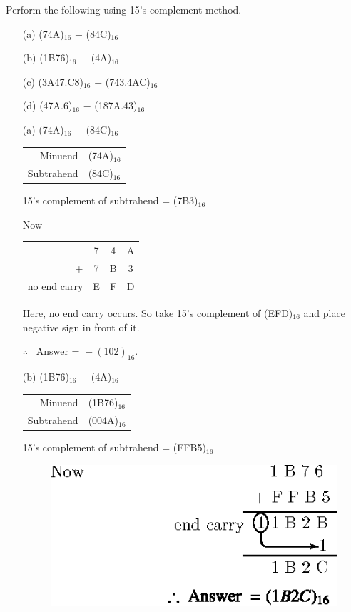 \eject

\begin{problem}\label{prob5.41}
Perform the following using 15's complement method.
\begin{itemize}
\item[(a)] (74A)$_{16}$ $-$ (84C)$_{16}$

\item[(b)] (1B76)$_{16}$ $-$ (4A)$_{16}$

\item[(c)] (3A47.C8)$_{16}$ $-$ (743.4AC)$_{16}$

\item[(d)] (47A.6)$_{16}$ $-$ (187A.43)$_{16}$
\end{itemize}
\end{problem}

\begin{solution}
\begin{itemize}
\item[(a)] (74A)$_{16}$ $-$ (84C)$_{16}$
\begin{center}
\begin{tabular}{r@{\;=\;}l}
Minuend & (74A)$_{16}$\\[3pt]
Subtrahend & (84C)$_{16}$
\end{tabular}
\end{center}
15's complement of subtrahend = (7B3)$_{16}$

Now
\begin{center}
\tabcolsep=4pt
\begin{tabular}{rccc}
 & 7 & 4 & A\\
+ & 7 & B & 3\\
\cline{2-4}
no end carry & E & F & D
\end{tabular}
\end{center}
Here, no end carry occurs. So take 15's complement of (EFD)$_{16}$ and place negative sign in front of it.

$\therefore$~ Answer = ${}-(102)_{16}$.

\item[(b)] (1B76)$_{16}$ $-$ (4A)$_{16}$
\begin{center}
\begin{tabular}{r@{\;=\;}l}
Minuend & (1B76)$_{16}$\\[3pt]
Subtrahend & (004A)$_{16}$
\end{tabular}
\end{center}
15's complement of subtrahend = (FFB5)$_{16}$
\begin{figure}[H]
\centering
\includegraphics{chap5/div51.eps}
\end{figure}


\end{itemize}
\end{solution}
